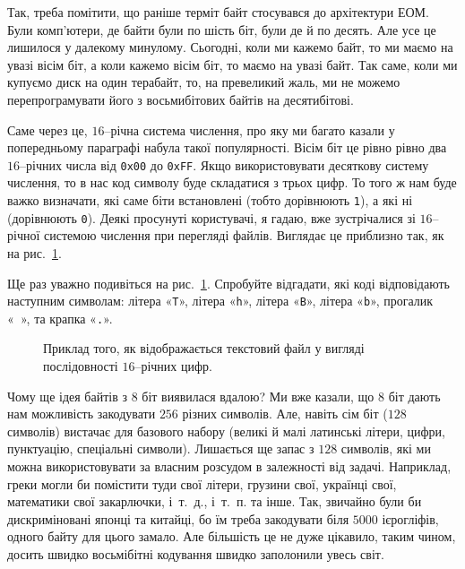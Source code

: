 \documentclass{book}
\newcommand{\bitstr}[1]{{\tt #1}}
\newcommand{\hexstr}[1]{{\tt 0x#1}}
\begin{document}
Так, треба помітити, що раніше терміт байт стосувався до архітектури ЕОМ.
Були комп'ютери, де байти були по шість біт, були де й по десять.
Але усе це лишилося у далекому минулому.
Сьогодні, коли ми кажемо байт, то ми маємо на увазі вісім біт, а коли кажемо вісім біт, то маємо на увазі байт.
Так саме, коли ми купуємо диск на один терабайт, то, на превеликий жаль, ми не можемо перепрограмувати його з восьмибітових байтів на десятибітові.

Саме через це, $16$--річна система числення, про яку ми багато казали у попередньому параграфі набула такої популярності.
Вісім біт це рівно рівно два $16$--річних числа від \hexstr{00} до \hexstr{FF}.
Якщо використовувати десяткову систему числення, то в нас код символу буде складатися з трьох цифр.
То того ж нам буде важко визначати, які саме біти встановлені (тобто дорівнюють \bitstr{1}), а які ні (дорівнюють \bitstr{0}).
Деякі просунуті користувачі, я гадаю, вже зустрічалися зі $16$--річної системою числення при перегляді файлів.
Виглядає це приблизно так, як на рис.~\ref{PicHexDump}.

\begin{exercise}
Ще раз уважно подивіться на рис.~\ref{PicHexDump}. Спробуйте відгадати, які коді відповідають наступним символам:
літера «\bitstr{T}»,
літера «\bitstr{h}»,
літера «\bitstr{B}»,
літера «\bitstr{b}»,
прогалик «\bitstr{~}»,
та крапка «\bitstr{.}».
\end{exercise}

\begin{figure}[t]
  \centering
  
  \caption{Приклад того, як відображається текстовий файл у вигляді послідовності $16$--річних цифр.}
  \label{PicHexDump}
\end{figure}

Чому ще ідея байтів з $8$ біт виявилася вдалою?
Ми вже казали, що $8$ біт дають нам можливість закодувати $256$ різних символів.
Але, навіть  сім біт ($128$ символів) вистачає для базового набору (великі й малі латинські літери, цифри, пунктуацію, спеціальні символи).
Лишається ще запас з $128$ символів, які ми можна використовувати за власним розсудом в залежності від задачі.
Наприклад, греки могли би помістити туди свої літери, грузини свої, українці свої, математики свої закарлючки, і~т.~д., і~т.~п. та інше.
Так, звичайно були би дискриміновані японці та китайці, бо їм треба закодувати біля $5000$ ієрогліфів, одного байту для цього замало.
Але більшість це не дуже цікавило, таким чином, досить швидко восьмібітні кодування швидко заполонили увесь світ.
\end{document}
